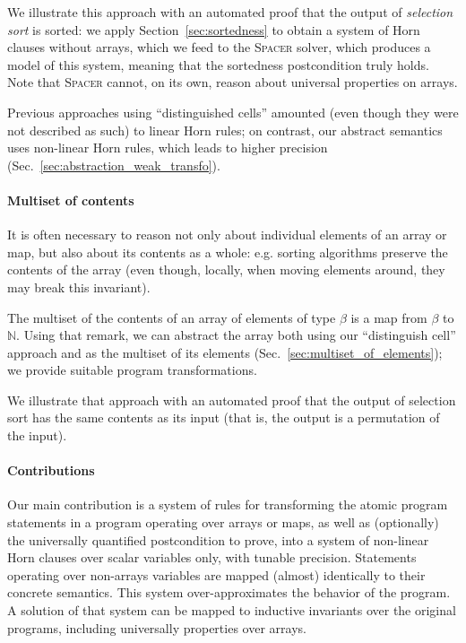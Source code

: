 \documentclass[a4paper]{article}
\newcommand{\NN}{\mathbb{N}}
\newcommand{\soft}[1]{\textsc{#1}}
\theoremstyle{definition}
\theoremstyle{plain}
\begin{document}
We illustrate this approach with an automated proof that the output of \emph{selection sort} is sorted: we apply Section~\ref{sec:sortedness} to obtain a system of Horn clauses without arrays, which we feed to the \soft{Spacer} solver, which produces a model of this system, meaning that the sortedness postcondition truly holds.
Note that \soft{Spacer} cannot, on its own, reason about universal properties on arrays.

Previous approaches \cite{Monniaux_Alberti_SAS2015} using ``distinguished cells'' amounted (even though they were not described as such) to linear Horn rules; on contrast, our abstract semantics uses non-linear Horn rules, which leads to higher precision (Sec.~\ref{sec:abstraction_weak_transfo}).


\paragraph{Multiset of contents}
It is often necessary to reason not only about individual elements of an array or map, but also about its contents as a whole: e.g. sorting algorithms preserve the contents of the array (even though, locally, when moving elements around, they may break this invariant).

The multiset of the contents of an array of elements of type $\beta$ is a map from $\beta$ to $\NN$.
Using that remark, we can abstract the array both using our ``distinguish cell'' approach and as the multiset of its elements (Sec.~\ref{sec:multiset_of_elements}); we provide suitable program transformations.

We illustrate that approach with an automated proof that the output of selection sort has the same contents as its input (that is, the output is a permutation of the input).

\paragraph{Contributions}
Our main contribution is a system of rules for transforming the atomic program statements in a program operating over arrays or maps, as well as (optionally) the universally quantified postcondition to prove, into a system of non-linear Horn clauses over scalar variables only, with tunable precision.
Statements operating over non-arrays variables are mapped (almost) identically to their concrete semantics.
This system over-approximates the behavior of the program.
A solution of that system can be mapped to inductive invariants over the original programs, including universally properties over arrays.
\end{document}
